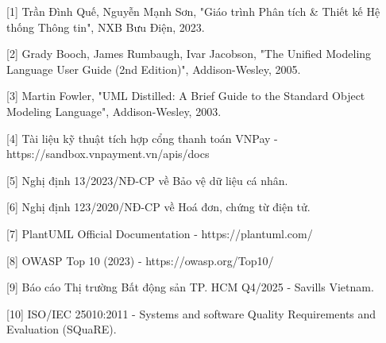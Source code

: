 
{[}1{]} Trần Đình Quế, Nguyễn Mạnh Sơn, "Giáo trình Phân tích \& Thiết
kế Hệ thống Thông tin", NXB Bưu Điện, 2023.

{[}2{]} Grady Booch, James Rumbaugh, Ivar Jacobson, "The Unified
Modeling Language User Guide (2nd Edition)", Addison-Wesley, 2005.

{[}3{]} Martin Fowler, "UML Distilled: A Brief Guide to the Standard
Object Modeling Language", Addison-Wesley, 2003.

{[}4{]} Tài liệu kỹ thuật tích hợp cổng thanh toán VNPay -
https://sandbox.vnpayment.vn/apis/docs

{[}5{]} Nghị định 13/2023/NĐ-CP về Bảo vệ dữ liệu cá nhân.

{[}6{]} Nghị định 123/2020/NĐ-CP về Hoá đơn, chứng từ điện tử.

{[}7{]} PlantUML Official Documentation - https://plantuml.com/

{[}8{]} OWASP Top 10 (2023) - https://owasp.org/Top10/

{[}9{]} Báo cáo Thị trường Bất động sản TP. HCM Q4/2025 - Savills
Vietnam.

{[}10{]} ISO/IEC 25010:2011 - Systems and software Quality Requirements
and Evaluation (SQuaRE).
